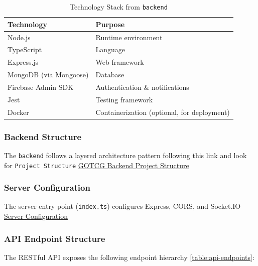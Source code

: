\begin{table}
    \centering
    \begin{tabular}{|s|t|}
        \hline
        \textbf{Technology} & \textbf{Purpose} \\ \hline
        Node.js & Runtime environment \\ \hline
        TypeScript & Language \\ \hline
        Express.js & Web framework \\ \hline
        MongoDB (via Mongoose) & Database \\ \hline
        Firebase Admin SDK & Authentication \& notifications \\ \hline
        Jest & Testing framework \\ \hline
        Docker & Containerization (optional, for deployment) \\ \hline
    \end{tabular}
    \caption{Technology Stack from \texttt{backend}}
    \label{tab:tsb}
\end{table}

\subsubsection*{Backend Structure}

The \texttt{backend} follows a layered architecture pattern following this link and look for \texttt{Project Structure} \href{https://github.com/tomaspettit2506/final-year-project/blob/main/backend/README.md}{GOTCG Backend Project Structure}

\subsubsection*{Server Configuration}

The server entry point (\texttt{index.ts}) configures Express, CORS, and Socket.IO \href{https://github.com/tomaspettit2506/final-year-project/blob/main/backend/src/index.ts}{Server Configuration}

\subsubsection*{API Endpoint Structure}

The RESTful API exposes the following endpoint hierarchy \ref{table:api-endpoints}:


